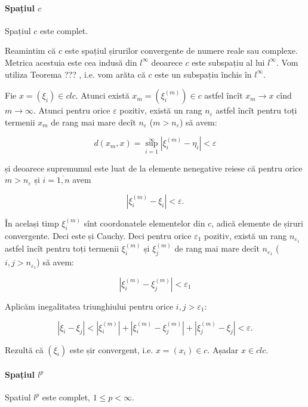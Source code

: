 \documentclass[a4paper,12pt]{article}
\theoremstyle{change}
\newenvironment{proof}[1][Proof]{\begin{trivlist}
\item[\hskip \labelsep {\bfseries #1}]}{\end{trivlist}}
\begin{document}
\paragraph{Spațiul $c$} Spațiul $c$ este complet. 

\begin{proof}
Reamintim că $c$ este spațiul șirurilor convergente de numere reale sau complexe.
Metrica acestuia este cea indusă din $l^\infty$ deoarece $c$ este subspațiu al lui $l^\infty$.
Vom utiliza Teorema ??? , i.e. vom arăta că $c$ este un subspațiu închis în $l^\infty$.

Fie $x=(\xi_i)\in cl c$. Atunci există $x_m=(\xi_i^{(m)})\in c$ astfel încît $x_m\to x$ cînd $m\to\infty$. Atunci pentru orice $\varepsilon$ pozitiv, există un rang $n_{\varepsilon}$ astfel încît pentru toți termenii $x_m$ de rang mai mare decît $n_{\varepsilon}$ ($m>n_{\varepsilon}$) să avem:

\[
  d(x_m,x) = \sup_{i=1}^{\infty} |\xi_i^{(m)} - \eta_i| < \varepsilon
\]

și deoarece supremumul este luat de la elemente nenegative reiese că pentru orice $m>n_\varepsilon$ și $i=\overline{1,n}$ avem

\[
|\xi_i^{(m)} - \xi_i| < \varepsilon.
\]

În același timp $\xi_i^{(m)}$ sînt coordonatele elementelor din $c$, adică elemente de șiruri convergente. Deci este și Cauchy. Deci pentru orice $\varepsilon_1$ pozitiv, există un rang $n_{\varepsilon_1}$ astfel încît pentru toți termenii $\xi_i^{(m)}$ și $\xi_j^{(m)}$ de rang mai mare decît $n_{\varepsilon_1}$ ($i,j>n_{\varepsilon_1}$) să avem:

\[
|\xi_i^{(m)}-\xi_j^{(m)}|<\varepsilon_1
\]

Aplicăm inegalitatea triunghiului pentru orice $i,j>\varepsilon_1$:

\[
|\xi_i-\xi_j|<|\xi_i^{(m)}|+|\xi_i^{(m)}-\xi_j^{(m)}|+|\xi_j^{(m)}-\xi_j|<\varepsilon.
\]

Rezultă că $(\xi_i)$ este șir convergent, i.e. $x=(x_i)\in c$. Așadar $x\in cl c$.
\end{proof}

\paragraph{Spațiul $l^p$} Spatiul $l^p$ este complet, $1\leq p<\infty$.
\end{document}
